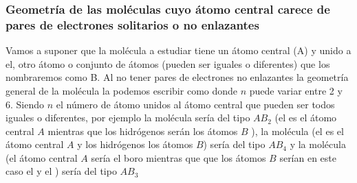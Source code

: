 %

\subsubsection[Geometría sin pares de electrones no enlazantes]{Geometría de las moléculas cuyo átomo central carece de pares de electrones solitarios o no enlazantes}

Vamos a suponer que la molécula a estudiar tiene un átomo central (A) y unido a el, otro átomo o conjunto de átomos (pueden ser iguales o diferentes) que los nombraremos como B.
Al no tener pares de electrones no enlazantes la geometría general de la molécula la podemos escribir como  donde $n$ puede variar entre 2 y 6.
Siendo \( n \) el número de átomo unidos al átomo central que pueden ser todos iguales o diferentes, por ejemplo la molécula  sería del tipo \( AB_2 \) (el  es el átomo central \( A \) mientras que los hidrógenos serán los átomos \( B \) ), la molécula  (el  es el átomo central \( A \) y los hidrógenos los átomos \( B \)) sería del tipo \( AB_4 \) y la molécula  (el átomo central \( A  \) sería el boro mientras que que los átomos \( B \) serían en este caso el  y el ) sería del tipo \( AB_3 \)


